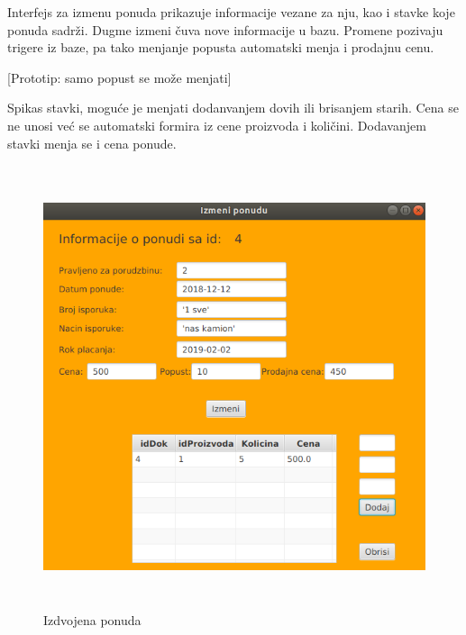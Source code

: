 \clearpage

Interfejs za izmenu ponuda prikazuje informacije vezane za nju, kao i stavke koje ponuda sadrži.
Dugme izmeni čuva nove informacije u bazu.
Promene pozivaju trigere iz baze, pa tako menjanje popusta automatski menja i prodajnu cenu.

[Prototip: samo popust se može menjati]

Spikas stavki, moguće je menjati dodanvanjem dovih ili brisanjem starih. Cena se ne unosi već se automatski formira iz cene proizvoda i količini. Dodavanjem stavki menja se i cena ponude.


\begin{figure}[ht]
\centering
\includegraphics[width=165mm,height=130mm]{slike/UI-5.png}%
\caption{Izdvojena ponuda}
\end{figure}

